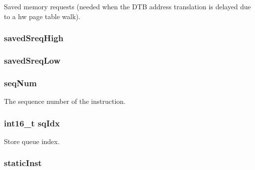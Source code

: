 \label{classBaseDynInst_a59b330383a8be2eaba12ac79b9d28dc2}
Saved memory requests (needed when the DTB address translation is delayed due to a hw page table walk). \hypertarget{classBaseDynInst_a0e8cac1ccea0f0428cb39947673bc31c}{
\subsubsection[{savedSreqHigh}]{ {\bf savedSreqHigh}}}
\label{classBaseDynInst_a0e8cac1ccea0f0428cb39947673bc31c}
\hypertarget{classBaseDynInst_a092c24fc1b01745b4611ef36265f778a}{
\subsubsection[{savedSreqLow}]{ {\bf savedSreqLow}}}
\label{classBaseDynInst_a092c24fc1b01745b4611ef36265f778a}
\hypertarget{classBaseDynInst_af9da73f56d2d0e7fd5009b70c4cf3542}{
\subsubsection[{seqNum}]{ {\bf seqNum}}}
\label{classBaseDynInst_af9da73f56d2d0e7fd5009b70c4cf3542}
The sequence number of the instruction. \hypertarget{classBaseDynInst_a9f5a94c5a008c1580f89d38e425a6528}{
\subsubsection[{sqIdx}]{\setlength{\rightskip}{0pt plus 5cm}int16\_\-t {\bf sqIdx}}}
\label{classBaseDynInst_a9f5a94c5a008c1580f89d38e425a6528}
Store queue index. \hypertarget{classBaseDynInst_a6799d48af805bf0bd72441e882589a6a}{
\subsubsection[{staticInst}]{ {\bf staticInst}}}
